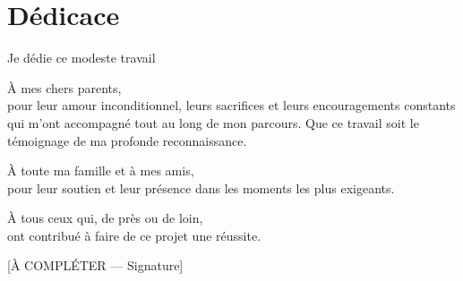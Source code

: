 \chapter*{Dédicace}
\thispagestyle{empty}

\begin{center}
\itshape
\vspace{2cm}

Je dédie ce modeste travail

\vspace{1cm}

À mes chers parents,\\
pour leur amour inconditionnel, leurs sacrifices et leurs encouragements
constants qui m'ont accompagné tout au long de mon parcours.
Que ce travail soit le témoignage de ma profonde reconnaissance.

\vspace{1cm}

À toute ma famille et à mes amis,\\
pour leur soutien et leur présence dans les moments les plus exigeants.

\vspace{1cm}

À tous ceux qui, de près ou de loin,\\
ont contribué à faire de ce projet une réussite.

\vspace{2cm}

[À COMPLÉTER — Signature]
\end{center}
